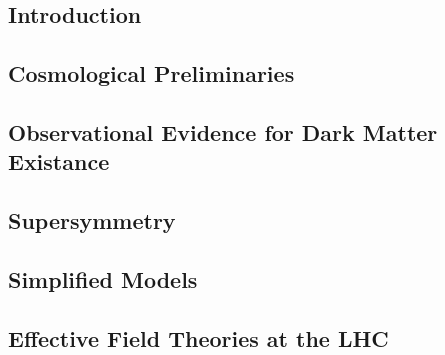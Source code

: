 \subsection{Introduction}
\subsection{Cosmological Preliminaries}
\subsection{Observational Evidence for Dark Matter Existance}
\subsection{Supersymmetry}
\subsection{Simplified Models}
\subsection{Effective Field Theories at the LHC}
